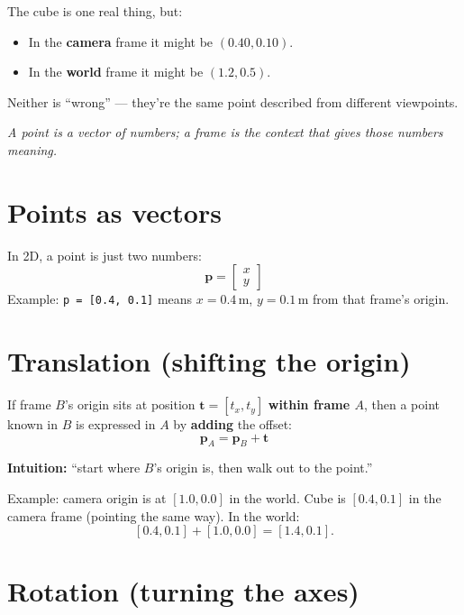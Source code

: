 \documentclass[11pt]{article}
\begin{document}
The cube is one real thing, but:
\begin{itemize}[leftmargin=*]
  \item In the \textbf{camera} frame it might be $(0.40, 0.10)$.
  \item In the \textbf{world} frame it might be $(1.2, 0.5)$.
\end{itemize}

Neither is ``wrong'' --- they're the same point described from different
viewpoints.

\begin{center}
\emph{A point is a vector of numbers; a frame is the context that gives those
numbers meaning.}
\end{center}

\section{Points as vectors}

In 2D, a point is just two numbers:
\[
  \mathbf{p} = \begin{bmatrix} x \\ y \end{bmatrix}
\]
Example: \texttt{p = [0.4, 0.1]} means $x=0.4$\,m, $y=0.1$\,m from that frame's
origin.

\section{Translation (shifting the origin)}

If frame $B$'s origin sits at position $\mathbf{t} = [t_x, t_y]$ \textbf{within
frame $A$}, then a point known in $B$ is expressed in $A$ by \textbf{adding} the
offset:
\[
  \mathbf{p}_A = \mathbf{p}_B + \mathbf{t}
\]

\textbf{Intuition:} ``start where $B$'s origin is, then walk out to the point.''

Example: camera origin is at $[1.0, 0.0]$ in the world. Cube is $[0.4, 0.1]$ in the
camera frame (pointing the same way). In the world:
\[
  [0.4, 0.1] + [1.0, 0.0] = [1.4, 0.1].
\]

\section{Rotation (turning the axes)}
\end{document}
